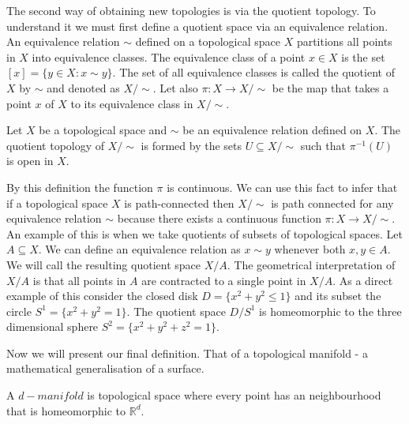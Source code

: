 The second way of obtaining new topologies is via the quotient topology. To understand it we must first define a quotient space via an equivalence relation. An equivalence relation $\sim$ defined on a topological space $X$ partitions all points in $X$ into equivalence classes. The equivalence class of a point $x \in X$ is the set $[x] = \{y \in X: x \sim y\}$. The set of all equivalence classes is called the quotient of $X$ by $\sim$ and denoted as $X / \sim$. Let also $\pi: X \to X/ \sim$ be the map that takes a point $x$ of $X$ to its equivalence class in $X / \sim$.

\begin{defn} Let $X$ be a topological space and $\sim$ be an equivalence relation defined on $X$. The quotient topology of $X / \sim$ is formed by the sets $U \subseteq X / \sim$ such that $\pi^{-1}(U)$ is open in $X$. \end{defn}

By this definition the function $\pi$ is continuous. We can use this fact to infer that if a topological space $X$ is path-connected then $X / \sim$ is path connected for any equivalence relation $\sim$ because there exists a continuous function $\pi : X \to X / \sim$. An example of this is when we take quotients of subsets of topological spaces. Let $A \subseteq X$. We can define an equivalence relation as $x \sim y$ whenever both $x, y \in A$. We will call the resulting quotient space $X / A$. The geometrical interpretation of $X / A$ is that all points in $A$ are contracted to a single point in $X / A$. As a direct example of this consider the closed disk $D = \{x^2 + y^2 \le 1\}$ and its subset the circle $S^1 = \{x^2 + y^2 = 1\}$.
The quotient space $D / S^1$ is homeomorphic to the three dimensional sphere $S^2 = \{x^2 + y^2 + z^2 = 1\}$.


Now we will present our final definition. That of a topological manifold - a mathematical generalisation of a surface.

\begin{defn} A $d-manifold$ is topological space where every point has an neighbourhood that is homeomorphic to $\mathbb{R}^d$.  \end{defn}

